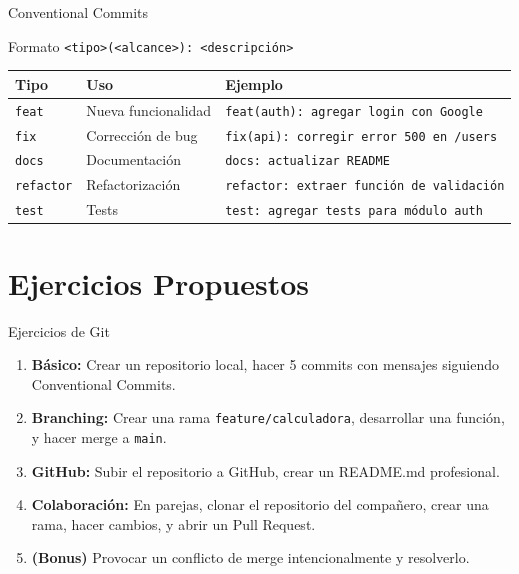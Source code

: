 \documentclass[aspectratio=169]{beamer}
\begin{document}
\begin{frame}{Conventional Commits}
    \begin{block}{Formato}
        \texttt{<tipo>(<alcance>): <descripción>}
    \end{block}
    
    \vspace{0.3cm}
    \begin{table}[]
        \centering
        \renewcommand{\arraystretch}{1.3}
        \begin{tabular}{p{2cm} p{4cm} p{5cm}}
            \toprule
            \textbf{Tipo} & \textbf{Uso} & \textbf{Ejemplo} \\
            \midrule
            \texttt{feat} & Nueva funcionalidad & \texttt{feat(auth): agregar login con Google} \\
            \texttt{fix} & Corrección de bug & \texttt{fix(api): corregir error 500 en /users} \\
            \texttt{docs} & Documentación & \texttt{docs: actualizar README} \\
            \texttt{refactor} & Refactorización & \texttt{refactor: extraer función de validación} \\
            \texttt{test} & Tests & \texttt{test: agregar tests para módulo auth} \\
            \bottomrule
        \end{tabular}
    \end{table}
\end{frame}

\section{Ejercicios Propuestos}

\begin{frame}{Ejercicios de Git}
    \begin{enumerate}
        \setlength\itemsep{0.8em}
        \item \textbf{Básico:} Crear un repositorio local, hacer 5 commits con mensajes siguiendo Conventional Commits.
        
        \item \textbf{Branching:} Crear una rama \texttt{feature/calculadora}, desarrollar una función, y hacer merge a \texttt{main}.
        
        \item \textbf{GitHub:} Subir el repositorio a GitHub, crear un README.md profesional.
        
        \item \textbf{Colaboración:} En parejas, clonar el repositorio del compañero, crear una rama, hacer cambios, y abrir un Pull Request.
        
        \item \textbf{(Bonus)} Provocar un conflicto de merge intencionalmente y resolverlo.
    \end{enumerate}
\end{frame}
\end{document}
